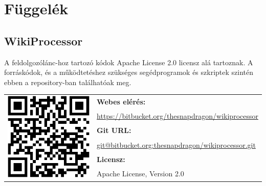 \chapter*{Függelék}

\section{WikiProcessor}
\label{sec:wikiprocessor}

A feldolgozólánc-hoz tartozó kódok Apache License 2.0 licensz alá tartoznak. A forráskódok, és a működtetéshez szükséges segédprogramok és szkriptek szintén ebben a repository-ban találhatóak meg.

\begin{table}[htb]
\begin{center}
\begin{tabular}{cl}
\multirow{6}{*}{\includegraphics[scale=0.3]{img/qrcode}}
& \textbf{Webes elérés:} \\
& \url{https://bitbucket.org/thesnapdragon/wikiprocessor} \\
& \textbf{Git URL:} \\
& \url{git@bitbucket.org:thesnapdragon/wikiprocessor.git} \\
& \textbf{Licensz:} \\
& Apache License, Version 2.0 \\
\end{tabular}
\end{center}
\end{table}

